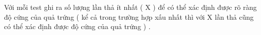 Với mỗi test ghi ra số lượng lần thả ít nhất ( X ) để có thể xác định được rõ ràng độ cứng của quả trứng ( kể cả trong trường hợp xấu nhất thì với X lần thả cũng có thể xác định được độ cứng của quả trứng ) .